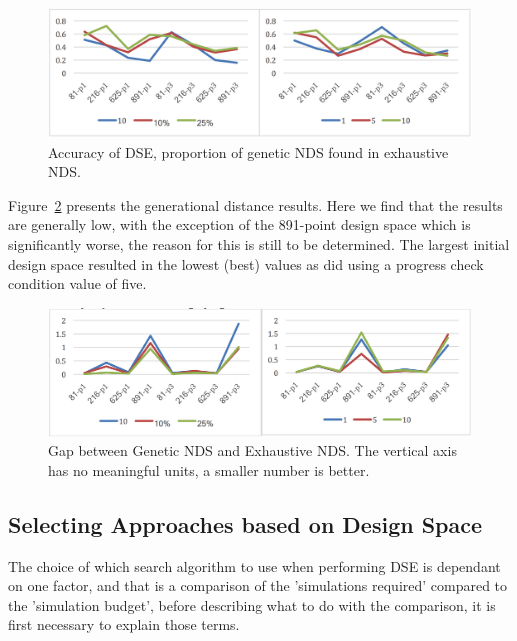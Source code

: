 \begin{figure}[p]
	\centering
	\includegraphics[width=1\textwidth]{figures/ga_accuracy}
	\caption{Accuracy of DSE, proportion of genetic NDS found in exhaustive NDS.}
	\label{fig:acc_ga_ex}
\end{figure}
Figure~\ref{fig:gap_ga_ex} presents the generational distance results.  Here we find that the results are generally low, with the exception of the 891-point design space which is significantly worse, the reason for this is still to be determined.  The largest initial design space resulted in the lowest (best) values as did using a progress check condition value of five.


\begin{figure}[p]
	\centering
	\includegraphics[width=1\textwidth]{figures/ga_distance}
	\caption{Gap between Genetic NDS and Exhaustive NDS.  The vertical axis has no meaningful units, a smaller number is better.}
	\label{fig:gap_ga_ex}
\end{figure}

\subsection{Selecting Approaches based on Design Space}





The choice of which search algorithm to use when performing DSE is dependant on one factor, and that is a comparison of the 'simulations required' compared to the 'simulation budget',  before describing what to do with the comparison, it is first necessary to explain those terms.  

